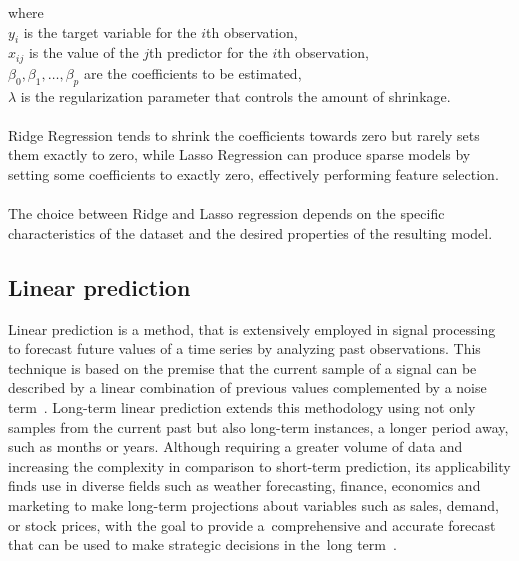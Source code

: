 \documentclass[12pt]{article}
\begin{document}
\noindent where\\
\(y_i\) is the target variable for the \(i\)th observation,\\
\(x_{ij}\) is the value of the \(j\)th predictor for the \(i\)th observation,\\
\(\beta_0, \beta_1, \ldots, \beta_p\) are the coefficients to be estimated,\\
\(\lambda\) is the regularization parameter that controls the amount of shrinkage.\\
\\
\noindent Ridge Regression tends to shrink the coefficients towards zero but rarely sets
them exactly to zero, while Lasso Regression can produce sparse models by setting some
coefficients to exactly zero, effectively performing feature selection.\\
\\
The choice between Ridge and Lasso regression depends on the specific characteristics of the dataset and the desired properties of the resulting model.

\subsection{Linear prediction}\label{lp}
Linear prediction is a method, that is extensively employed in signal
processing to forecast future values of a time series by analyzing past observations.
This technique is based on the premise that the current sample of a signal can be described by a linear combination
of previous values complemented by a noise term~\cite{vaidyanathan2007theory,  WOS:000415735500004}. Long-term linear
prediction extends this methodology using not only samples from the current past but also long-term instances, a longer period away, such as months
or years. Although requiring a greater volume of data and increasing the complexity in comparison to
 short-term prediction, its applicability finds use in diverse fields such as weather forecasting, finance, economics and
marketing to make long-term projections about variables such as sales, demand, or stock
prices, with the goal to provide a~comprehensive and accurate forecast that can be used to
make strategic decisions in the~long term~\cite{WOS:A1989AG08300005}.
%
\end{document}
